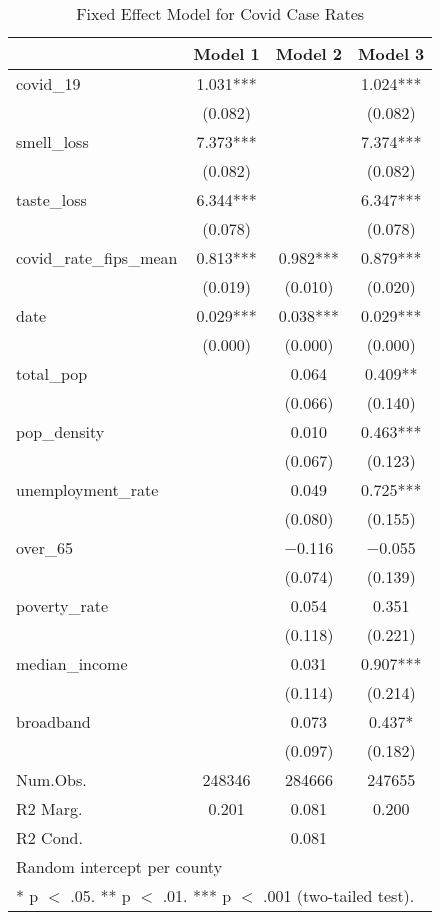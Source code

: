 \begin{table}[!h]

\caption{\label{tab:covid_analysis}Fixed Effect Model for Covid Case Rates}
\centering
\fontsize{8}{10}\selectfont

\begin{tabular}{lccc}
\toprule
  & Model 1 & Model 2 & Model 3\\
\midrule
covid\_19 & \num{1.031}*** &  & \num{1.024}***\\
 & (\num{0.082}) &  & \vphantom{1} (\num{0.082})\\
smell\_loss & \num{7.373}*** &  & \num{7.374}***\\
 & (\num{0.082}) &  & (\num{0.082})\\
taste\_loss & \num{6.344}*** &  & \num{6.347}***\\
 & (\num{0.078}) &  & (\num{0.078})\\
covid\_rate\_fips\_mean & \num{0.813}*** & \num{0.982}*** & \num{0.879}***\\
 & (\num{0.019}) & (\num{0.010}) & (\num{0.020})\\
date & \num{0.029}*** & \num{0.038}*** & \num{0.029}***\\
 & (\num{0.000}) & (\num{0.000}) & (\num{0.000})\\
total\_pop &  & \num{0.064} & \num{0.409}**\\
 &  & (\num{0.066}) & (\num{0.140})\\
pop\_density &  & \num{0.010} & \num{0.463}***\\
 &  & (\num{0.067}) & (\num{0.123})\\
unemployment\_rate &  & \num{0.049} & \num{0.725}***\\
 &  & (\num{0.080}) & (\num{0.155})\\
over\_65 &  & \num{-0.116} & \num{-0.055}\\
 &  & (\num{0.074}) & (\num{0.139})\\
poverty\_rate &  & \num{0.054} & \num{0.351}\\
 &  & (\num{0.118}) & (\num{0.221})\\
median\_income &  & \num{0.031} & \num{0.907}***\\
 &  & (\num{0.114}) & (\num{0.214})\\
broadband &  & \num{0.073} & \num{0.437}*\\
 &  & (\num{0.097}) & (\num{0.182})\\
\midrule
Num.Obs. & \num{248346} & \num{284666} & \num{247655}\\
R2 Marg. & \num{0.201} & \num{0.081} & \num{0.200}\\
R2 Cond. &  & \num{0.081} & \\
\bottomrule
\multicolumn{4}{l}{\rule{0pt}{1em}Random intercept per county}\\
\multicolumn{4}{l}{\rule{0pt}{1em}* p $<$ .05. ** p $<$ .01. *** p $<$ .001 (two-tailed test).}\\
\end{tabular}
\end{table}